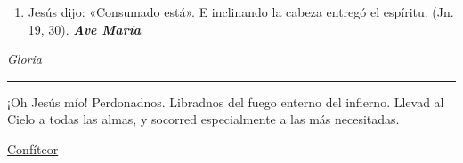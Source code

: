 \documentclass[a4paper,11pt, oneside]{report}
\begin{document}
{{\begin{enumerate}
        \item Jesús dijo: «Consumado está». E inclinando la cabeza entregó el espíritu. (Jn. 19, 30). \textbf{\textit{Ave María}}

      \end{enumerate}
      
      \indent\textit{Gloria} \par      

      \begin{center}\rule{1\linewidth}{\linethickness}\end{center}      
      
      \medskip
      \hypertarget{finalMuerte}{¡Oh Jesús mío! Perdonadnos. Libradnos del fuego enterno del infierno. Llevad al Cielo a todas las almas, y socorred especialmente a las más 
      necesitadas.}
    }

  \par\bigskip
  \hyperlink{sec:confiteor}{Confíteor}
}
        
\end{document}
